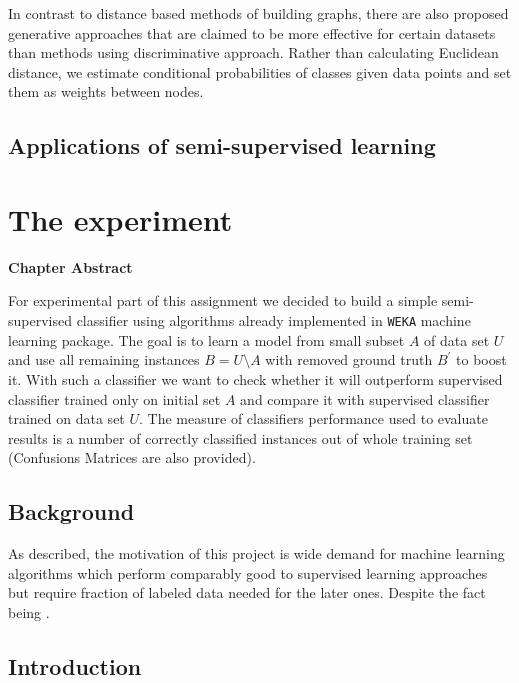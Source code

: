 \documentclass[12pt, a4paper, pdflatex]{report}
\newenvironment{chapabstract}
{
	\vspace{0.5cm}
	\small
	\begin{center}
    \bfseries Chapter Abstract
    \end{center}
}{\vspace{1.5cm}}
\begin{document}
In contrast to distance based methods of building graphs, there are also proposed generative approaches that are claimed to be more effective for certain datasets than methods using discriminative approach\cite{He07}. Rather than calculating Euclidean distance, we estimate conditional probabilities of classes given data points and set them as weights between nodes. 

\section{Applications of semi-supervised learning}

\chapter{The experiment}

\begin{chapabstract}
For experimental part of this assignment we decided to build a simple semi-supervised classifier using algorithms already implemented in \texttt{WEKA} machine learning package. The goal is to learn a model from small subset $A$ of data set $U$ and use all remaining instances $B = U \setminus A$ with removed ground truth $B^{\prime}$ to boost it. With such a classifier we want to check whether it will outperform supervised classifier trained only on initial set $A$ and compare it with supervised classifier trained on data set $U$. The measure of classifiers performance used to evaluate results is a number of correctly classified instances out of whole training set (Confusions Matrices are also provided).
\end{chapabstract}

\section{Background}
As described, the motivation of this project is wide demand for machine learning algorithms which perform comparably good to supervised learning approaches but require fraction of labeled data needed for the later ones. Despite the fact being .

\section{Introduction}
\lipsum[1]
\end{document}
